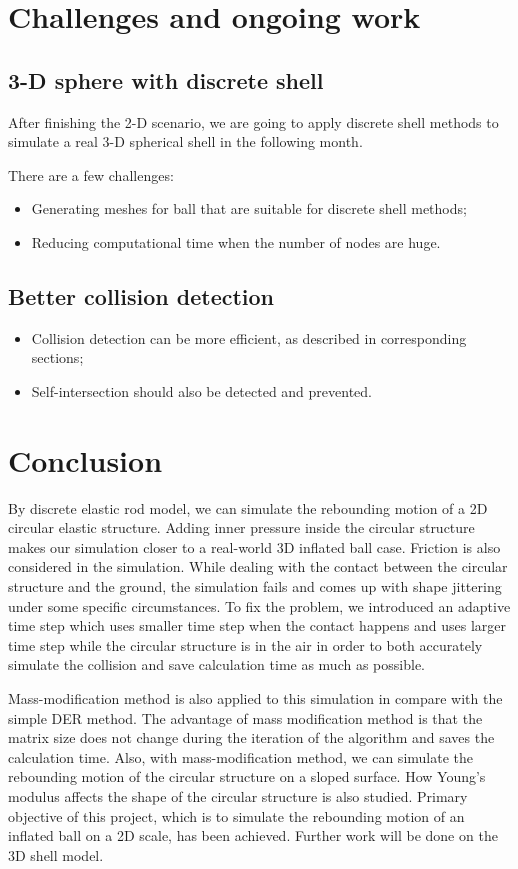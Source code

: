 \documentclass[letterpaper,9pt,twocolumn]{extarticle}
\begin{document}
\section{Challenges and ongoing work}
	\subsection{3-D sphere with discrete shell}
		After finishing the 2-D scenario, we are going to apply discrete shell methods to simulate a real 3-D spherical shell in the following month.
		
		There are a few challenges:
		\begin{itemize}
			\item Generating meshes for ball that are suitable for discrete shell methods;
			\item Reducing computational time when the number of nodes are huge.
		\end{itemize}
	\subsection{Better collision detection}
		\begin{itemize}
			\item Collision detection can be more efficient, as described in corresponding sections;
			\item Self-intersection should also be detected and prevented.
		\end{itemize}
\section{Conclusion}
	By discrete elastic rod model, we can simulate the rebounding motion of a 2D circular elastic structure. Adding inner pressure inside the circular structure makes our simulation closer to a real-world 3D inflated ball case. Friction is also considered in the simulation. While dealing with the contact between the circular structure and the ground, the simulation fails and comes up with shape jittering under some specific circumstances. To fix the problem, we introduced an adaptive time step which uses smaller time step when the contact happens and uses larger time step while the circular structure is in the air in order to both accurately simulate the collision and save calculation time as much as possible.
	
	Mass-modification method is also applied to this simulation in compare with the simple DER method. The advantage of mass modification method is that the matrix size does not change during the iteration of the algorithm and saves the calculation time. Also, with mass-modification method, we can simulate the rebounding motion of the circular structure on a sloped surface. How Young's modulus affects the shape of the circular structure is also studied. Primary objective of this project, which is to simulate the rebounding motion of an inflated ball on a 2D scale, has been achieved. Further work will be done on the 3D shell model.

\end{document}
